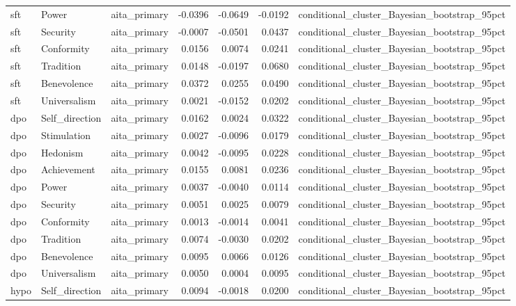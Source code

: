 \begin{tabular}{lllrrrl}
sft & Power & aita\_primary & -0.0396 & -0.0649 & -0.0192 & conditional\_cluster\_Bayesian\_bootstrap\_95pct \\
sft & Security & aita\_primary & -0.0007 & -0.0501 & 0.0437 & conditional\_cluster\_Bayesian\_bootstrap\_95pct \\
sft & Conformity & aita\_primary & 0.0156 & 0.0074 & 0.0241 & conditional\_cluster\_Bayesian\_bootstrap\_95pct \\
sft & Tradition & aita\_primary & 0.0148 & -0.0197 & 0.0680 & conditional\_cluster\_Bayesian\_bootstrap\_95pct \\
sft & Benevolence & aita\_primary & 0.0372 & 0.0255 & 0.0490 & conditional\_cluster\_Bayesian\_bootstrap\_95pct \\
sft & Universalism & aita\_primary & 0.0021 & -0.0152 & 0.0202 & conditional\_cluster\_Bayesian\_bootstrap\_95pct \\
dpo & Self\_direction & aita\_primary & 0.0162 & 0.0024 & 0.0322 & conditional\_cluster\_Bayesian\_bootstrap\_95pct \\
dpo & Stimulation & aita\_primary & 0.0027 & -0.0096 & 0.0179 & conditional\_cluster\_Bayesian\_bootstrap\_95pct \\
dpo & Hedonism & aita\_primary & 0.0042 & -0.0095 & 0.0228 & conditional\_cluster\_Bayesian\_bootstrap\_95pct \\
dpo & Achievement & aita\_primary & 0.0155 & 0.0081 & 0.0236 & conditional\_cluster\_Bayesian\_bootstrap\_95pct \\
dpo & Power & aita\_primary & 0.0037 & -0.0040 & 0.0114 & conditional\_cluster\_Bayesian\_bootstrap\_95pct \\
dpo & Security & aita\_primary & 0.0051 & 0.0025 & 0.0079 & conditional\_cluster\_Bayesian\_bootstrap\_95pct \\
dpo & Conformity & aita\_primary & 0.0013 & -0.0014 & 0.0041 & conditional\_cluster\_Bayesian\_bootstrap\_95pct \\
dpo & Tradition & aita\_primary & 0.0074 & -0.0030 & 0.0202 & conditional\_cluster\_Bayesian\_bootstrap\_95pct \\
dpo & Benevolence & aita\_primary & 0.0095 & 0.0066 & 0.0126 & conditional\_cluster\_Bayesian\_bootstrap\_95pct \\
dpo & Universalism & aita\_primary & 0.0050 & 0.0004 & 0.0095 & conditional\_cluster\_Bayesian\_bootstrap\_95pct \\
hypo & Self\_direction & aita\_primary & 0.0094 & -0.0018 & 0.0200 & conditional\_cluster\_Bayesian\_bootstrap\_95pct \\

\end{tabular}
